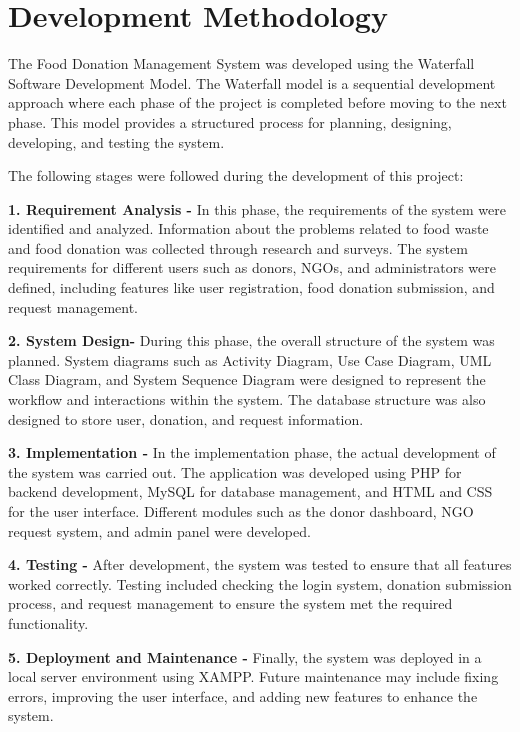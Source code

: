 \section{Development Methodology}

The Food Donation Management System was developed using the Waterfall Software Development Model. The Waterfall model is a sequential development approach where each phase of the project is completed before moving to the next phase. This model provides a structured process for planning, designing, developing, and testing the system.

The following stages were followed during the development of this project:

 \vspace{20pt}
\textbf{1. Requirement Analysis - }In this phase, the requirements of the system were identified and analyzed. Information about the problems related to food waste and food donation was collected through research and surveys. The system requirements for different users such as donors, NGOs, and administrators were defined, including features like user registration, food donation submission, and request management.

 \vspace{20pt}
\textbf{2. System Design-} During this phase, the overall structure of the system was planned. System diagrams such as Activity Diagram, Use Case Diagram, UML Class Diagram, and System Sequence Diagram were designed to represent the workflow and interactions within the system. The database structure was also designed to store user, donation, and request information.

 \vspace{20pt}
\textbf{3. Implementation -} In the implementation phase, the actual development of the system was carried out. The application was developed using PHP for backend development, MySQL for database management, and HTML and CSS for the user interface. Different modules such as the donor dashboard, NGO request system, and admin panel were developed.

 \vspace{20pt}
\textbf{4. Testing -} After development, the system was tested to ensure that all features worked correctly. Testing included checking the login system, donation submission process, and request management to ensure the system met the required functionality.

 \vspace{20pt}
\textbf{5. Deployment and Maintenance -} Finally, the system was deployed in a local server environment using XAMPP. Future maintenance may include fixing errors, improving the user interface, and adding new features to enhance the system.


